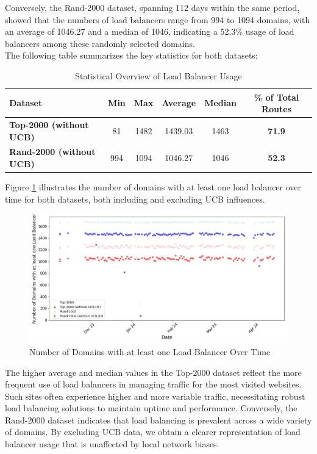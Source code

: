 \documentclass[12pt]{cwru_thesis}
\begin{document}
Conversely, the Rand-2000 dataset, spanning 112 days within the same period, showed that the numbers of load balancers range from 994 to 1094 domains, with an average of 1046.27 and a median of 1046, indicating a 52.3\% usage of load balancers among these randomly selected domains.\\

The following table summarizes the key statistics for both datasets:

\begin{table}[h]
\centering
\begin{tabular}{|l|c|c|c|c|c|}
\hline
\textbf{Dataset} & \textbf{Min} & \textbf{Max} & \textbf{Average} & \textbf{Median} &\textbf{\% of Total Routes}\\
\hline

\textbf{Top-2000 (without UCB)} & 81 & 1482 & 1439.03 & 1463 & \textbf{71.9} \\
\textbf{Rand-2000 (without UCB)} & 994 & 1094 & 1046.27 & 1046 & \textbf{52.3}  \\
\hline
\end{tabular}
\caption{Statistical Overview of Load Balancer Usage}
\label{tab:stats_overview}
\end{table}

Figure \ref{fig:stat_plot} illustrates the number of domains with at least one load balancer over time for both datasets, both including and excluding UCB influences.

\begin{figure}[h]
\centering
\includegraphics[width=\textwidth]{figures/scatter_plot_domains.png}
\caption{Number of Domains with at least one Load Balancer Over Time}
\label{fig:stat_plot}
\end{figure}

The higher average and median values in the Top-2000 dataset reflect the more frequent use of load balancers in managing traffic for the most visited websites. Such sites often experience higher and more variable traffic, necessitating robust load balancing solutions to maintain uptime and performance. Conversely, the Rand-2000 dataset indicates that load balancing is prevalent across a wide variety of domains. By excluding UCB data, we obtain a clearer representation of load balancer usage that is unaffected by local network biases.
\end{document}
